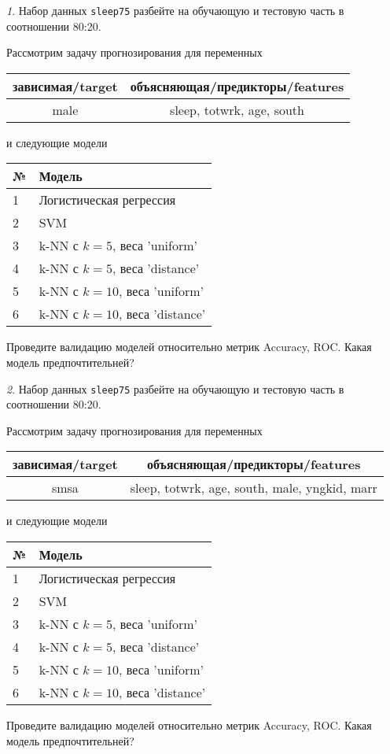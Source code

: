 \documentclass[12pt]{article}
\theoremstyle{remark}
\newtheorem{exercise}{}[section]
\begin{document}
\begin{exercise}
Набор данных \texttt{sleep75} разбейте на обучающую и тестовую часть
в соотношении 80:20.

Рассмотрим задачу прогнозирования для переменных
\begin{center}
	\begin{tabular}{|c|c|}\hline
		зависимая/target & объясняющая/предикторы/features \\ \hline
		male & sleep, totwrk, age, south \\ \hline
	\end{tabular}
\end{center}
и следующие модели
\begin{center}
	\begin{tabular}{|l|l|}\hline
		№ & Модель \\ \hline
		1 & Логистическая регрессия\\
		2 & SVM \\ 
		3 & k-NN с \(k=5\), веса 'uniform' \\
		4 & k-NN с \(k=5\), веса 'distance' \\
		5 & k-NN с \(k=10\), веса 'uniform' \\
		6 & k-NN с \(k=10\), веса 'distance' \\ \hline
	\end{tabular}
\end{center}
Проведите валидацию моделей относительно метрик Accuracy, ROC. 
Какая модель предпочтительней?
\end{exercise}

\begin{exercise}
Набор данных \texttt{sleep75} разбейте на обучающую и тестовую часть
в соотношении 80:20.

Рассмотрим задачу прогнозирования для переменных
\begin{center}
	\begin{tabular}{|c|c|}\hline
		зависимая/target & объясняющая/предикторы/features \\ \hline
		smsa & sleep, totwrk, age, south, male, yngkid, marr \\ \hline
	\end{tabular}
\end{center}
и следующие модели
\begin{center}
	\begin{tabular}{|l|l|}\hline
		№ & Модель \\ \hline
		1 & Логистическая регрессия\\
		2 & SVM \\ 
		3 & k-NN с \(k=5\), веса 'uniform' \\
		4 & k-NN с \(k=5\), веса 'distance' \\
		5 & k-NN с \(k=10\), веса 'uniform' \\
		6 & k-NN с \(k=10\), веса 'distance' \\ \hline
	\end{tabular}
\end{center}
Проведите валидацию моделей относительно метрик Accuracy, ROC. Какая модель предпочтительней?
\end{exercise}
\end{document}
